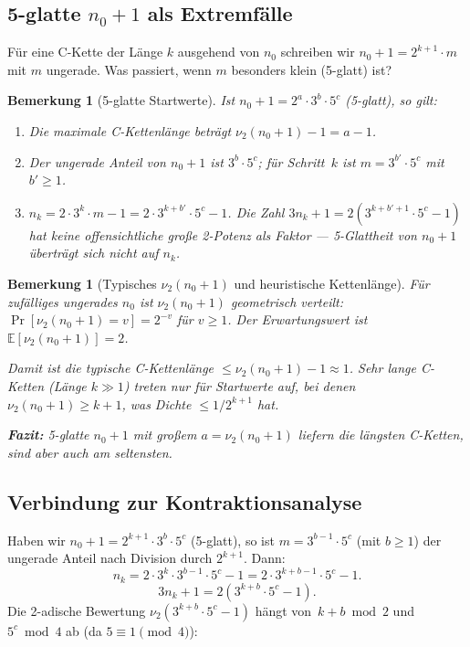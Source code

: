\documentclass[12pt,a4paper]{article}
\newtheorem{bemerkung}[definition]{Bemerkung}
\newcommand{\vii}{\nu_2}
\begin{document}
	\subsection{5-glatte $n_0+1$ als Extremfälle}
	
	Für eine C-Kette der Länge $k$ ausgehend von $n_0$ schreiben wir
	$n_0+1 = 2^{k+1} \cdot m$ mit $m$ ungerade. Was passiert, wenn $m$ besonders
	klein (5-glatt) ist?
	
	\begin{bemerkung}[5-glatte Startwerte]
		Ist $n_0 + 1 = 2^a \cdot 3^b \cdot 5^c$ (5-glatt), so gilt:
		\begin{enumerate}[label=(\roman*)]
			\item Die maximale C-Kettenlänge beträgt $\vii(n_0+1) - 1 = a - 1$.
			\item Der ungerade Anteil von $n_0+1$ ist $3^b \cdot 5^c$; für Schritt~$k$
			ist $m = 3^{b'} \cdot 5^c$ mit $b' \geq 1$.
			\item $n_k = 2 \cdot 3^k \cdot m - 1 = 2 \cdot 3^{k+b'} \cdot 5^c - 1$.
			Die Zahl $3n_k+1 = 2(3^{k+b'+1}\cdot 5^c - 1)$ hat keine offensichtliche
			große 2-Potenz als Faktor --- 5-Glattheit von $n_0+1$ überträgt sich
			\emph{nicht} auf $n_k$.
		\end{enumerate}
	\end{bemerkung}
	
	\begin{bemerkung}[Typisches $\vii(n_0+1)$ und heuristische Kettenlänge]
		Für zufälliges ungerades $n_0$ ist $\vii(n_0+1)$ geometrisch verteilt:
		$\Pr[\vii(n_0+1) = v] = 2^{-v}$ für $v \geq 1$.
		Der Erwartungswert ist $\mathbb{E}[\vii(n_0+1)] = 2$.
		
		Damit ist die \emph{typische} C-Kettenlänge $\leq \vii(n_0+1) - 1 \approx 1$.
		Sehr lange C-Ketten (Länge $k \gg 1$) treten nur für Startwerte auf, bei
		denen $\vii(n_0+1) \geq k+1$, was Dichte $\leq 1/2^{k+1}$ hat.
		
		\textbf{Fazit:} 5-glatte $n_0+1$ mit großem $a = \vii(n_0+1)$ liefern die
		längsten C-Ketten, sind aber auch am seltensten.
	\end{bemerkung}
	
	\subsection{Verbindung zur Kontraktionsanalyse}
	
	Haben wir $n_0+1 = 2^{k+1} \cdot 3^b \cdot 5^c$ (5-glatt), so ist
	$m = 3^{b-1} \cdot 5^c$ (mit $b \geq 1$) der ungerade Anteil nach Division
	durch $2^{k+1}$. Dann:
	\[
	n_k = 2 \cdot 3^k \cdot 3^{b-1} \cdot 5^c - 1 = 2 \cdot 3^{k+b-1} \cdot 5^c - 1.
	\]
	\[
	3n_k + 1 = 2(3^{k+b} \cdot 5^c - 1).
	\]
	Die 2-adische Bewertung $\vii(3^{k+b} \cdot 5^c - 1)$ hängt von~$k+b \bmod 2$
	und $5^c \bmod 4$ ab (da $5 \equiv 1 \pmod 4$):
	
\end{document}
